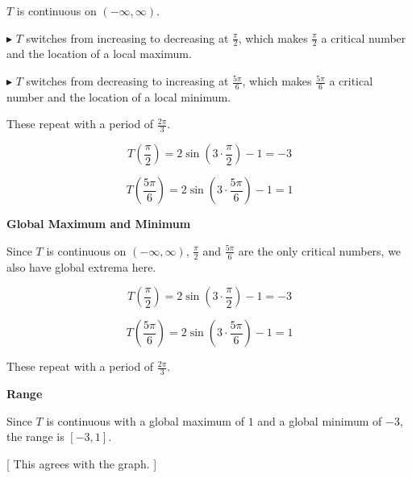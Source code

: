 \documentclass{ximera}
\begin{document}
$T$ is continuous on $(-\infty, \infty)$.


$\blacktriangleright$ $T$ switches from increasing to decreasing at $\frac{\pi}{2}$, which makes $\frac{\pi}{2}$ a critical number and the location of a local maximum. 




$\blacktriangleright$ $T$ switches from decreasing to increasing at $\frac{5\pi}{6}$, which makes $\frac{5\pi}{6}$ a critical number and the location of a local minimum. 


These repeat with a period of $\frac{2\pi}{3}$. 



\[
T\left( \frac{\pi}{2} \right) = 2 \sin\left(3 \cdot \frac{\pi}{2} \right) - 1 = -3
\]




\[
T\left( \frac{5\pi}{6} \right) = 2 \sin\left(3 \cdot \frac{5\pi}{6} \right) - 1 = 1
\]












\textbf{\textcolor{blue!55!black}{Global Maximum and Minimum}}


Since $T$ is continuous on $(-\infty, \infty)$, $\frac{\pi}{2}$ and $\frac{5\pi}{6}$ are the only critical numbers, we also have global extrema here. 




\[
T\left( \frac{\pi}{2} \right) = 2 \sin\left(3 \cdot \frac{\pi}{2} \right) - 1 = -3
\]




\[
T\left( \frac{5\pi}{6} \right) = 2 \sin\left(3 \cdot \frac{5\pi}{6} \right) - 1 = 1
\]




These repeat with a period of $\frac{2\pi}{3}$. 









\textbf{\textcolor{blue!55!black}{Range}}


Since $T$ is continuous with a global maximum of $1$ and a global minimum of $-3$, the range is $[-3, 1]$.  



[ This agrees with the graph. ]
\end{document}
